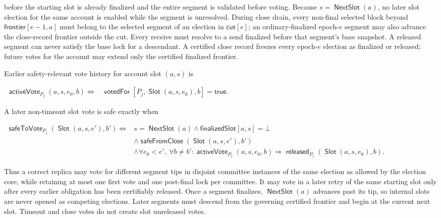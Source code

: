 \documentclass[sigplan,twocolumn,review,anonymous]{acmart}
\newcommand{\func}[1]{\operatorname{\mathsf{#1}}}
\newcommand{\Slot}{\func{Slot}}
\newcommand{\NextSlot}{\func{NextSlot}}
\newcommand{\true}{\mathsf{true}}
\newcommand{\frontier}{\mathsf{frontier}}
\newcommand{\finalizedSlot}{\mathsf{finalizedSlot}}
\newcommand{\votedFor}{\func{votedFor}}
\newcommand{\released}{\func{released}}
\newcommand{\safeToVote}{\func{safeToVote}}
\newcommand{\activeVote}{\func{activeVote}}
\newcommand{\closeCut}{\mathsf{cut}}
\newcommand{\safeFromClose}{\func{safeFromClose}}
\begin{document}
before the starting slot is already finalized and the entire segment is validated before voting.
Because \(s=\NextSlot(a)\), no later slot election for the same account is enabled while the segment is
unresolved.  During close drain, every non-final selected block beyond \(\frontier[e-1,a]\) must belong to the
selected segment of an election in \(\closeCut[e]\); an ordinary-finalized epoch-\(e\) segment may also
advance the close-record frontier outside the cut.  Every receive must resolve to a send finalized
before that segment's base snapshot.  A released segment can never satisfy the base lock for a
descendant.  A certified close record freezes every epoch-\(e\) election as finalized or released;
future votes for the account may extend only the certified finalized frontier.

Earlier safety-relevant vote history for account slot \((a,s)\) is
\begin{center}
\begin{adjustbox}{max width=\columnwidth}
\(\displaystyle
\begin{aligned}
\activeVote_{P_j}(a,s,e_0,b)
\iff{}& \votedFor[P_j,\Slot(a,s,e_0),b]=\true.
\end{aligned}
\)
\end{adjustbox}
\end{center}
A later non-timeout slot vote is safe exactly when
\begin{center}
\begin{adjustbox}{max width=\columnwidth}
\(\displaystyle
\begin{aligned}
\safeToVote_{P_j}(\Slot(a,s,e'),b')
\iff{}& s=\NextSlot(a)\wedge\finalizedSlot[a,s]=\bot \\
&\wedge\safeFromClose(\Slot(a,s,e'),b')\\
&\wedge\forall e_0<e',\ \forall b\neq b':
\activeVote_{P_j}(a,s,e_0,b)\Rightarrow
\released_{P_j}(\Slot(a,s,e_0),b).
\end{aligned}
\)
\end{adjustbox}
\end{center}
Thus a correct replica may vote for different segment tips in disjoint committee instances of the same
election as allowed by the election core, while retaining at most one first vote and one post-final lock
per committee.  It may vote in a later retry of the same starting slot only after every earlier
obligation has been certifiably released.  Once a segment finalizes, \(\NextSlot(a)\) advances past its
tip, so internal slots are never opened as competing elections.  Later segments must descend from the
governing certified frontier and begin at the current next slot.  Timeout and close votes do not create
slot unreleased votes.
\end{document}
